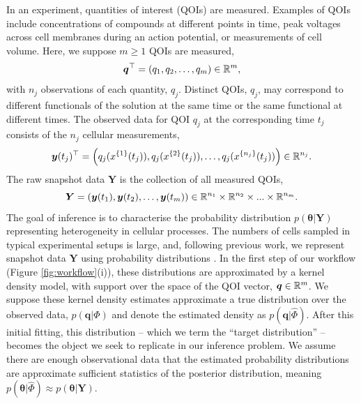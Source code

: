 In an experiment, quantities of interest (QOIs) are measured. Examples of QOIs include concentrations of compounds at different points in time, peak voltages across cell membranes during an action potential, or measurements of cell volume. Here, we suppose $m\geq 1$ QOIs are measured,
%
\begin{equation}
\boldsymbol{q}^\top = \left( q_1, q_2, \dots, q_m \right) \in \mathbb{R}^m,
\end{equation}
%
with $n_j$ observations of each quantity, $q_j$. Distinct QOIs, $q_j$, may correspond to different functionals of the solution at the same time or the same functional at different times. The observed data for QOI $q_j$ at the corresponding time $t_j$ consists of the $n_j$ cellular measurements,
%
\begin{equation}
\boldsymbol{y}(t_j)^\top = \left( q_j(x^{\{1\}}(t_j)), q_j(x^{\{2\}}(t_j)), \dots, q_j(x^{\{n_j\}}(t_j))  \right) \in \mathbb{R}^{n_j}.
\end{equation}
%
The raw snapshot data $\boldsymbol{Y}$ is the collection of all measured QOIs,
%
\begin{equation}
\boldsymbol{Y} = \left( \boldsymbol{y}(t_1), \boldsymbol{y}(t_2), \dots, \boldsymbol{y}(t_m) \right) \in \mathbb{R}^{n_1} \times \mathbb{R}^{n_2}\times...\times\mathbb{R}^{n_m}.
\end{equation}
%
The goal of inference is to characterise the probability distribution $p(\boldsymbol{\theta}|\boldsymbol{Y})$ representing heterogeneity in cellular processes. The numbers of cells sampled in typical experimental setups is large, and, following previous work, we represent snapshot data $\boldsymbol{Y}$ using probability distributions \cite{hasenauer2011identification,hasenauer2014ode,loos2018hierarchical,dixit2018maximum}. In the first step of our workflow (Figure \ref{fig:workflow}(i)), these distributions are approximated by a kernel density model, with support over the space of the QOI vector, $\boldsymbol{q}\in\mathbb{R}^m$. We suppose these kernel density estimates approximate a true distribution over the observed data, $p(\boldsymbol{q}|\Phi)$ and denote the estimated density as $p(\boldsymbol{q}|\hat \Phi)$. After this initial fitting, this distribution -- which we term the ``target distribution'' -- becomes the object we seek to replicate in our inference problem. We assume there are enough observational data that the estimated probability distributions are approximate sufficient statistics of the posterior distribution, meaning $p(\boldsymbol{\theta}|\hat{\Phi}) \approx p(\boldsymbol{\theta}|\boldsymbol{Y})$.

